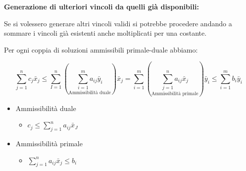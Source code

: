 \textbf{Generazione di ulteriori vincoli da quelli già disponibili:}

Se si volessero generare altri vincoli validi si potrebbe procedere andando a sommare i vincoli già esistenti 
anche moltiplicati per una costante.



\begin{myproof}
    Per ogni coppia di soluzioni ammissibili primale-duale abbiamo:

    $$
    \sum_{j=1}^{n} c_{j} \bar{x}_{j} \leqslant \sum_{I=1}^{n}\left(\underset{\text{Ammissibilità duale}}{\sum_{i=1}^{m} a_{i j} \bar{y}_{i}}\right) \bar{x}_{j}=\sum_{i=1}^{m}\left(\underset{\text{Ammissibilità primale}}{\sum_{j=1}^{n} a_{i j} \bar{x}_{j}}\right) \bar{y}_{i} \leqslant \sum_{i=1}^{m} b_{i} \bar{y}_{i}
    $$

    \begin{itemize}
        \item Ammissibilità duale
        \begin{itemize}
            \item $c_j \leqslant \sum_{j=1}^{n} a_{i j} \bar{x}_{J}$
        \end{itemize}
        \item Ammissibilità primale
        \begin{itemize}
            \item $\sum_{j=1}^{n} a_{i j} \bar{x}_{j} \leqslant b_i$
        \end{itemize}
    \end{itemize}
\end{myproof}


